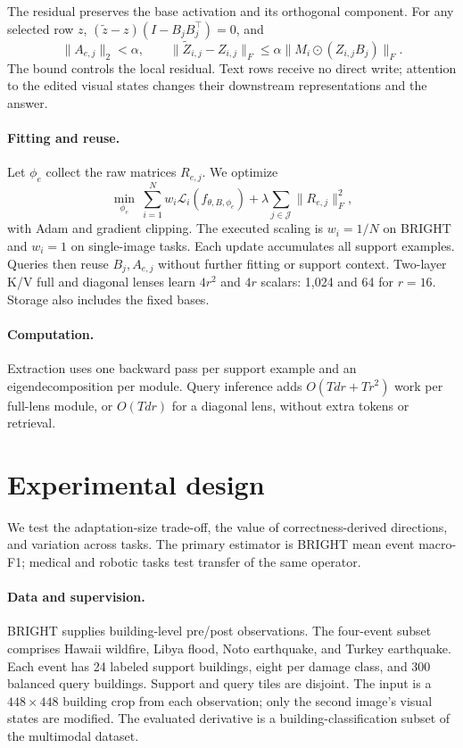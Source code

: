 \documentclass{article}
\newcommand{\Lset}{\mathcal{J}}
\begin{document}
The residual preserves the base activation and its orthogonal component. For any selected row $z$, $(\widetilde z-z)(I-B_jB_j^\top)=0$, and
\begin{equation}
 \|A_{e,j}\|_2<\alpha,\qquad
 \|\widetilde Z_{i,j}-Z_{i,j}\|_F
 \leq\alpha\|M_i\odot(Z_{i,j}B_j)\|_F.
 \label{eq:bound}
\end{equation}
The bound controls the local residual. Text rows receive no direct write; attention to the edited visual states changes their downstream representations and the answer.

\paragraph{Fitting and reuse.}
Let $\phi_e$ collect the raw matrices $R_{e,j}$. We optimize
\begin{equation}
 \min_{\phi_e}\ \sum_{i=1}^{N}w_i\mathcal L_i(f_{\theta,B,\phi_e})
 +\lambda\sum_{j\in\Lset}\|R_{e,j}\|_F^2,
 \label{eq:fit}
\end{equation}
with Adam and gradient clipping. The executed scaling is $w_i=1/N$ on BRIGHT and $w_i=1$ on single-image tasks. Each update accumulates all support examples. Queries then reuse $B_j,A_{e,j}$ without further fitting or support context. Two-layer K/V full and diagonal lenses learn $4r^2$ and $4r$ scalars: 1,024 and 64 for $r=16$. Storage also includes the fixed bases.

\paragraph{Computation.}
Extraction uses one backward pass per support example and an eigendecomposition per module. Query inference adds $O(Tdr+Tr^2)$ work per full-lens module, or $O(Tdr)$ for a diagonal lens, without extra tokens or retrieval.



\section{Experimental design}
\label{sec:setup}
We test the adaptation-size trade-off, the value of correctness-derived directions, and variation across tasks. The primary estimator is BRIGHT mean event macro-F1; medical and robotic tasks test transfer of the same operator.

\paragraph{Data and supervision.}
BRIGHT \citep{chen2025bright} supplies building-level pre/post observations. The four-event subset comprises Hawaii wildfire, Libya flood, Noto earthquake, and Turkey earthquake. Each event has 24 labeled support buildings, eight per damage class, and 300 balanced query buildings. Support and query tiles are disjoint. The input is a $448\times448$ building crop from each observation; only the second image's visual states are modified. The evaluated derivative is a building-classification subset of the multimodal dataset.
\end{document}
